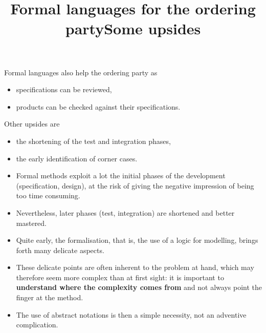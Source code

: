 \documentclass[wide]{slides}
\begin{document}
\begin{slide}
  \title{Formal languages for the ordering party}

  Formal languages also help the ordering party as
  \begin{itemize}

    \item specifications can be reviewed,

    \item products can be checked against their specifications.

  \end{itemize}

  \bigskip

  Other upsides are
  \begin{itemize}

    \item the shortening of the test and integration phases,

    \item the early identification of corner cases.

  \end{itemize}

\end{slide}

\begin{slide}
  \title{Some upsides}

  \begin{itemize}

    \item Formal methods exploit a lot the initial phases of the
      development (specification, design), at the risk of giving the
      negative impression of being too time consuming.

    \item Nevertheless, later phases (test, integration) are shortened
      and better mastered.

    \item Quite early, the formalisation, that is, the use of a logic
      for modelling, brings forth many delicate aspects.

    \item These delicate points are often inherent to the problem at
      hand, which may therefore seem more complex than at first sight:
      it is important to \textbf{understand where the complexity comes
        from} and not always point the finger at the method.

    \item The use of abstract notations is then a simple necessity,
      not an adventive complication.

  \end{itemize}

\end{slide}
\end{document}
